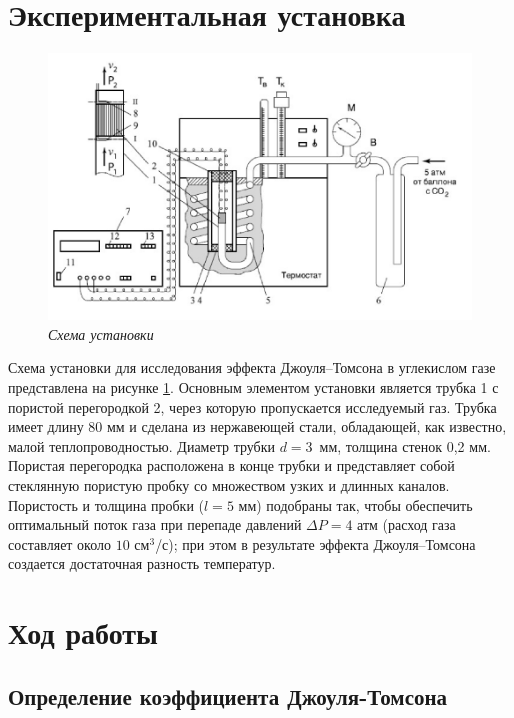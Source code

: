 \documentclass[12pt,a4paper]{article}
\begin{document}
\section{Экспериментальная установка}

\begin{figure}[H]
	\begin{center}
		\includegraphics[width=18cm]{2.1.6_1}
	\end{center}
	\caption{\textit{Схема установки}}
	\label{ust}
\end{figure}

Схема установки для исследования эффекта Джоуля–Томсона в углекислом газе представлена на рисунке \ref{ust}. Основным элементом установки является трубка 1 с пористой перегородкой 2, через которую пропускается исследуемый газ. Трубка имеет длину 80 мм и сделана из нержавеющей стали, обладающей, как известно, малой теплопроводностью. Диаметр трубки $ d = 3 $~мм, толщина стенок 0,2 мм. Пористая перегородка расположена в конце трубки и представляет собой стеклянную пористую пробку со множеством узких и длинных каналов. Пористость и толщина пробки ($ l = 5 $ мм) подобраны так, чтобы обеспечить оптимальный поток газа при перепаде давлений $ \Delta P = 4 $ атм (расход газа составляет около $ 10 $ см$ ^3 $/с); при этом в результате эффекта Джоуля–Томсона создается достаточная разность температур.


\section{Ход работы}

\subsection{Определение коэффициента Джоуля-Томсона}
\end{document}
